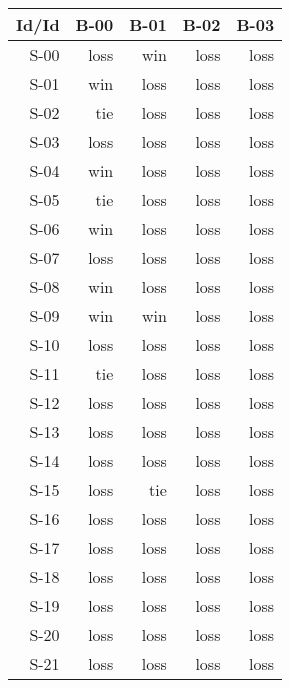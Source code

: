 \begin{tabular}{ | r | r | r | r | r | }
    \hline
        Id/Id  &   B-00  &   B-01  &   B-02  &   B-03  \\
    \hline
    \hline
         S-00  &   loss  &    win  &   loss  &   loss  \\
    \hline
         S-01  &    win  &   loss  &   loss  &   loss  \\
    \hline
         S-02  &    tie  &   loss  &   loss  &   loss  \\
    \hline
         S-03  &   loss  &   loss  &   loss  &   loss  \\
    \hline
         S-04  &    win  &   loss  &   loss  &   loss  \\
    \hline
         S-05  &    tie  &   loss  &   loss  &   loss  \\
    \hline
         S-06  &    win  &   loss  &   loss  &   loss  \\
    \hline
         S-07  &   loss  &   loss  &   loss  &   loss  \\
    \hline
         S-08  &    win  &   loss  &   loss  &   loss  \\
    \hline
         S-09  &    win  &    win  &   loss  &   loss  \\
    \hline
         S-10  &   loss  &   loss  &   loss  &   loss  \\
    \hline
         S-11  &    tie  &   loss  &   loss  &   loss  \\
    \hline
         S-12  &   loss  &   loss  &   loss  &   loss  \\
    \hline
         S-13  &   loss  &   loss  &   loss  &   loss  \\
    \hline
         S-14  &   loss  &   loss  &   loss  &   loss  \\
    \hline
         S-15  &   loss  &    tie  &   loss  &   loss  \\
    \hline
         S-16  &   loss  &   loss  &   loss  &   loss  \\
    \hline
         S-17  &   loss  &   loss  &   loss  &   loss  \\
    \hline
         S-18  &   loss  &   loss  &   loss  &   loss  \\
    \hline
         S-19  &   loss  &   loss  &   loss  &   loss  \\
    \hline
         S-20  &   loss  &   loss  &   loss  &   loss  \\
    \hline
         S-21  &   loss  &   loss  &   loss  &   loss  \\

\end{tabular}
